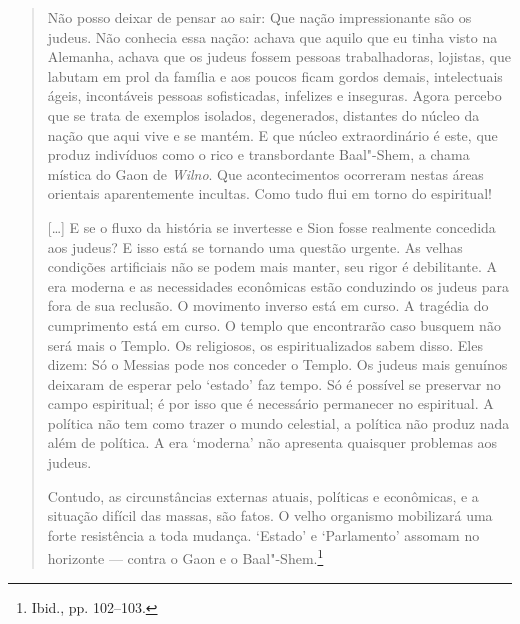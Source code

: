 \begin{quote}
Não posso deixar de pensar ao sair: Que nação impressionante são os
judeus. Não conhecia essa nação: achava que aquilo que eu tinha visto na
Alemanha, achava que os judeus fossem pessoas trabalhadoras, lojistas,
que labutam em prol da família e aos poucos ficam gordos demais,
intelectuais ágeis, incontáveis pessoas sofisticadas, infelizes e
inseguras. Agora percebo que se trata de exemplos isolados, degenerados,
distantes do núcleo da nação que aqui vive e se mantém. E que núcleo
extraordinário é este, que produz indivíduos como o rico e transbordante
Baal"-Shem, a chama mística do Gaon de \textit{Wilno}. Que acontecimentos
ocorreram nestas áreas orientais aparentemente incultas. Como tudo flui
em torno do espiritual!

[\ldots{}] E se o fluxo da história se invertesse e Sion fosse realmente
concedida aos judeus? E isso está se tornando uma questão urgente. As
velhas condições artificiais não se podem mais manter, seu rigor é
debilitante. A era moderna e as necessidades econômicas estão conduzindo
os judeus para fora de sua reclusão. O movimento inverso está em curso.
A tragédia do cumprimento está em curso. O templo que encontrarão caso
busquem não será mais o Templo. Os religiosos, os espiritualizados sabem
disso. Eles dizem: Só o Messias pode nos conceder o Templo. Os judeus
mais genuínos deixaram de esperar pelo `estado' faz tempo. Só é possível
se preservar no campo espiritual; é por isso que é necessário permanecer
no espiritual. A política não tem como trazer o mundo celestial, a
política não produz nada além de política. A era `moderna' não apresenta
quaisquer problemas aos judeus.

Contudo, as circunstâncias externas atuais, políticas e econômicas, e a
situação difícil das massas, são fatos. O velho organismo mobilizará uma
forte resistência a toda mudança. `Estado' e `Parlamento' assomam no
horizonte --- contra o Gaon e o Baal"-Shem.\footnote{Ibid., pp. 102--103.}
\end{quote}

